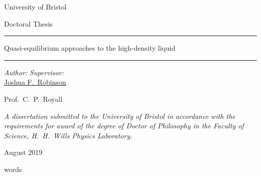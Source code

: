\documentclass[11pt,twoside]{report}
\DeclareRobustCommand{\wordcount}{}
\begin{document}

\thispagestyle{empty}
\begin{center}
  \begin{minipage}{0.8\linewidth}
    \centering
    \vspace{3cm}
    {\Large \sc University of Bristol \par}
    \vspace{2cm}
    {\Large \sc Doctoral Thesis \par}
    \vspace{1cm}
    \rule{\textwidth}{0.4pt} \par
    {\LARGE \sc \color{bristolred} Quasi-equilibrium approaches to the high-density liquid \par}
    \rule{\textwidth}{0.4pt} \par
    \vspace{2cm}
    {\large \it Author:}
    \hfill
    {\large \it Supervisor:} \\
    {\sc \large \href{mailto:joshua.robinson@bristol.ac.uk}{Joshua F.\ Robinson}}
    \hfill
    {\sc \large Prof.\ C.\ P.\ Royall \par}
    \vspace{3.5cm}
   {\large \it A dissertation submitted to the University of Bristol in accordance with the requirements for award of the degree of Doctor of Philosophy in the Faculty of Science, H.\ H.\ Wills Physics Laboratory. \par}
    \vspace{1em}
    {\large August 2019 \par}
  \end{minipage}
  \mbox{}
  \vfill
  \begin{minipage}{0.8\linewidth}
    \raggedleft
    {\large \wordcount words}
  \end{minipage}
\end{center}

\cleardoublepage
\cleardoublepage
\cleardoublepage
\cleardoublepage
\cleardoublepage
\end{document}
